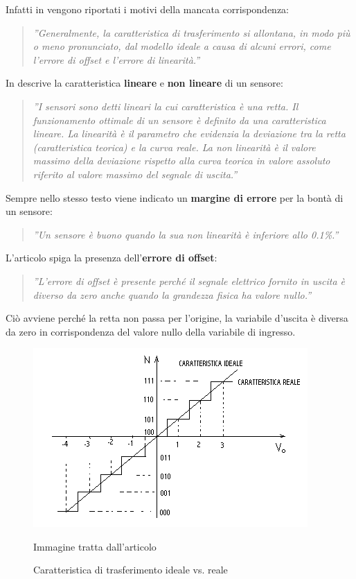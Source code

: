 \documentclass[a4paper]{report} %
\begin{document}
Infatti in \cite{art:rif.1} vengono riportati i motivi della mancata corrispondenza:
\begin{quote} 
	\textit{''Generalmente, la caratteristica di trasferimento si allontana, in modo più o meno pronunciato, dal modello ideale a causa di alcuni errori, come l'errore di offset e l'errore di linearità.''}
\end{quote}


In \cite{art:rif.11} descrive la caratteristica \textbf{lineare} e \textbf{non lineare} di un sensore:
\begin{quote}
	\textit{''I sensori sono detti lineari la cui caratteristica è una retta. Il funzionamento ottimale di un sensore è definito da una caratteristica lineare. La linearità è il parametro che evidenzia la deviazione tra la retta (caratteristica teorica) e la curva reale. 
	La non linearità è il valore massimo della deviazione rispetto alla curva teorica in valore assoluto riferito al valore massimo del segnale di uscita.''}
\end{quote} 
Sempre nello stesso testo viene indicato un \textbf{margine di errore} per la bontà di un sensore:	
\begin{quote}
	\textit{''Un sensore è buono quando la sua non linearità è inferiore allo 0.1\%.''}
\end{quote}

L'articolo \cite{art:rif.1} spiga la presenza dell'\textbf{errore di offset}:
\begin{quote} 
	\textit{''L'errore di offset è presente perché il segnale elettrico fornito in uscita è diverso da zero anche quando la grandezza fisica ha valore nullo.''} 
\end{quote} 	
Ciò avviene perché la retta non passa per l'origine, la variabile d'uscita è diversa da zero in corrispondenza del valore nullo della variabile di ingresso. 

\begin{figure}
	\centering
	\includegraphics[scale=.8]{Immagini/CarTrasferimento.png}
	\caption{Caratteristica di trasferimento ideale vs. reale}
	\label{fig:caratteristicatrasferimento}
	Immagine tratta dall'articolo \cite{art:rif.19}
\end{figure}
\end{document}
